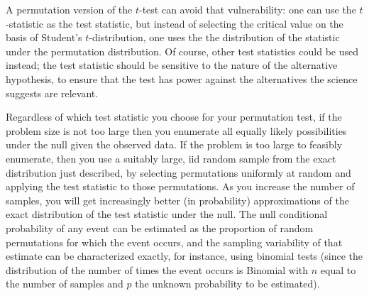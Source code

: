 \begin{example}[label=exa:cont]
A permutation version of the $t$-test can avoid that vulnerability: one can
use the $t$-statistic as the test statistic, but instead of selecting the critical
value on the basis of Student's $t$-distribution, one uses the
the distribution of the statistic under the permutation distribution.
Of course, other test statistics could be used instead; the test statistic
should be sensitive to the nature of the alternative hypothesis, to ensure
that the test has power against the alternatives the science suggests are
relevant.

Regardless of which test statistic you choose for your permutation test, if the
problem size is not too large then you enumerate all equally likely
possibilities under the null given the observed data.  If the problem is too
large to feasibly enumerate, then you use a suitably large, iid random 
sample from the exact distribution just described, by selecting permutations
uniformly at random and applying the test statistic to those permutations.  As you increase the number
of samples, you will get increasingly better (in probability) approximations of the exact
distribution of the test statistic under the null.  The null conditional probability of any
event can be estimated as the proportion of random permutations for which the event occurs,
and the sampling variability of that estimate can be characterized exactly, for instance,
using binomial tests (since the distribution of the number of times the event occurs
is Binomial with $n$ equal to the number of samples and $p$ the unknown probability to be
estimated). 
\end{example}


